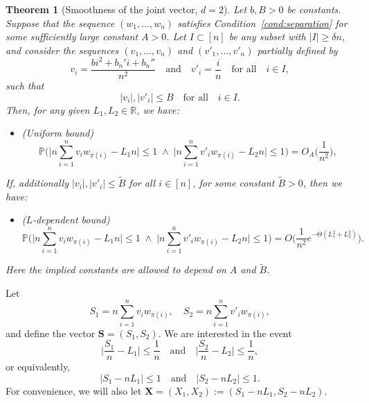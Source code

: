 \documentclass[reqno]{amsart}
\newcommand\R{{\mathbb{R}}}
\renewcommand\P{{\mathbb{P}}}
\newcommand\BMS{{\bm S}}
\newcommand\BMX{{\bm X}}
\theoremstyle{plain}
\newtheorem{theorem}{Theorem}[section]
\theoremstyle{definition}
\begin{document}
\begin{theorem}[Smoothness of the joint vector, $d=2$]\label{thm:comparison:2vs1:d=2}
Let $b, B>0$ be constants. Suppose that the sequence $(w_{1}, \ldots, w_{n})$ satisfies Condition~\ref{cond:separation} for some sufficiently large constant $A > 0$. Let $I\subset [n]$ be any subset with $|I|\ge \delta n$, and consider the sequences $(v_{1},\dots,v_{n})$ and  $(v'_{1},\dots,v'_{n})$ partially defined by
\[
v_{i}=\frac{b i^2 + b_{n}' i + b_{n}''}{n^{2}} \quad \text{and} \quad v'_{i}=\frac{i}{n} \quad \text{for all} \quad i\in I,
\]
such that
\[
|v_{i}|,|v'_{i}|\le B \quad \text{for all} \quad i\in I.
\]
Then, for any given $L_1, L_2\in \R$, we have:
\begin{itemize}
\item (Uniform bound)
\begin{equation}\label{eqn:comparison:2D:u}
\P\Big( \Big| n\sum_{i=1}^{n} v_{i} w_{\pi(i)} - L_1 n \Big| \le 1 
\;\wedge\; 
\Big| n\sum_{i=1}^{n} v'_i w_{\pi(i)} - L_2 n \Big| \le 1 \Big) 
= O_{A}\Big( \frac{1}{n^2} \Big),
\end{equation}
\end{itemize}
If, additionally $|v_{i}|,|v'_{i}|\le \widetilde{B}$ for all $i\in [n]$, for some constant $\widetilde{B}>0$, then we have:
\begin{itemize}
\item ($L$-dependent bound)
\begin{equation}\label{eqn:comparison:2D:L}
\P\Big( \Big|n \sum_{i=1}^{n} v_{i} w_{\pi(i)} - L_1 n \Big| \le 1 
\;\wedge\; 
\Big| n\sum_{i=1}^{n} v'_{i} w_{\pi(i)} - L_2 n \Big| \le 1 \Big) 
= O\Big( \frac{1}{n^2} e^{-\Theta(L_1^2 + L_2^2)} \Big).
\end{equation}
\end{itemize}
Here the implied constants are allowed to depend on $A$ and $\widetilde{B}$.
\end{theorem}


Let 
\[
S_1 =n \sum_{i=1}^{n} v_{i} w_{\pi(i)}, \quad 
S_2 =n \sum_{i=1}^{n} v'_{i} w_{\pi(i)},
\]
and define the vector $\BMS = (S_1, S_2)$. We are interested in the event
\[
\Big| \frac{S_1}{n} - L_1 \Big| \le \frac{1}{n} \quad \text{and} \quad \Big| \frac{S_2}{n} - L_2 \Big| \le \frac{1}{n},
\]
or equivalently,
\[
|S_1 - nL_1| \le 1 \quad \text{and} \quad |S_2 - nL_2| \le 1.
\]
For convenience, we will also let $\BMX = (X_1, X_2) := (S_1 - nL_1, S_2 - nL_2)$. 
\end{document}
